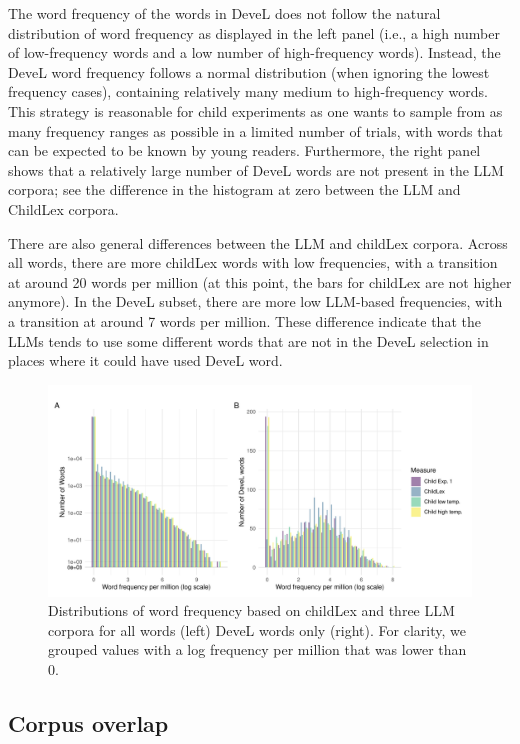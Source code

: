 \documentclass[doc, a4paper, anonymous]{apa7}
\begin{document}
The word frequency of the words in DeveL does not follow the natural distribution of word frequency as displayed in the left panel (i.e., a high number of low-frequency words and a low number of high-frequency words). Instead, the DeveL word frequency follows a normal distribution (when ignoring the lowest frequency cases), containing relatively many medium to high-frequency words. This strategy is reasonable for child experiments as one wants to sample from as many frequency ranges as possible in a limited number of trials, with words that can be expected to be known by young readers. Furthermore, the right panel shows that a relatively large number of DeveL words are not present in the LLM corpora; see the difference in the histogram at zero between the LLM and ChildLex corpora. 

There are also general differences between the LLM and childLex corpora. Across all words, there are more childLex words with low frequencies, with a transition at around 20 words per million (at this point, the bars for childLex are not higher anymore). In the DeveL subset, there are more low LLM-based frequencies, with a transition at around 7 words per million. These difference indicate that the LLMs tends to use some different words that are not in the DeveL selection in places where it could have used DeveL word. 

\begin{figure}[!htbp]
    \includegraphics[width = .8\paperwidth]{figures/combined_hist_all4-trans.pdf}
    \caption{Distributions of word frequency based on childLex and three LLM corpora for all words (left) DeveL words only (right). For clarity, we grouped values with a log frequency per million that was lower than 0.}
    \label{fig:combined_hist_all4}
\end{figure}

\clearpage


\subsection{Corpus overlap}
\end{document}
